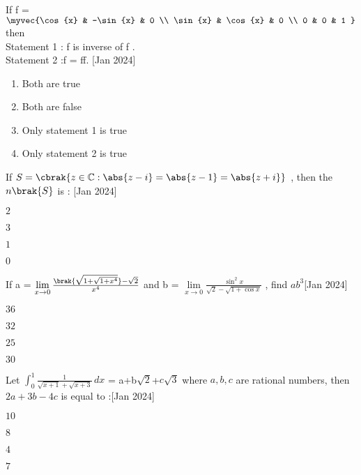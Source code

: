 \iffalse
\title{2024}
\author{EE24BTECH11036}
\section{mcq-single}
\fi

\item If f = $ \myvec{\cos{x} & -\sin{x} & 0 \\ \sin{x} & \cos{x} & 0 \\ 0 & 0 & 1 } $ then \\ Statement 1 : f is inverse of f . \\ Statement 2 :f = ff. \hfill{[Jan 2024]}
\begin{enumerate}
\item Both are true 
\item Both are false 
\item Only statement 1 is true 
\item Only statement 2 is true 
\end{enumerate}
\item If $S=\cbrak{z\in\mathbb{C}:\abs{z-i}=\abs{z-1}=\abs{z+i}}$ , then the $n\brak{S}$ is : \hfill{[Jan 2024]}
\begin{enumerate}
\begin{multicols}{4}
\item $ 2 $
\item $ 3 $
\item $ 1 $
\item $ 0 $
\end{multicols}
\end{enumerate}
\item If a = $ \lim\limits_{x\to0} \frac{\brak{\sqrt{1+\sqrt{1+x^4}}}-\sqrt{2}}{x^4} $ and  b = $ \lim\limits_{x\to0} \frac{\sin^2{x}}{\sqrt{2}-\sqrt{1+\cos{x}}} $ , find $ ab^3 $\hfill{[Jan 2024]}
\begin{enumerate}
\begin{multicols}{4}
\item $ 36 $
\item $ 32 $
\item $ 25 $
\item $ 30 $
\end{multicols}
\end{enumerate}
\item Let $ \int_0^1 \frac{1}{\sqrt{x+1}+\sqrt{x+3}} \, dx $ = a+b$ \sqrt{2} $+$ c\sqrt{3} $ where $ a,b,c $ are rational numbers, then  $ 2a+3b-4c $ is equal to :\hfill{[Jan 2024]}
\begin{enumerate}
\begin{multicols}{4}
\item $ 10 $
\item $ 8 $
\item $ 4 $
\item $ 7 $
\end{multicols}
\end{enumerate}
